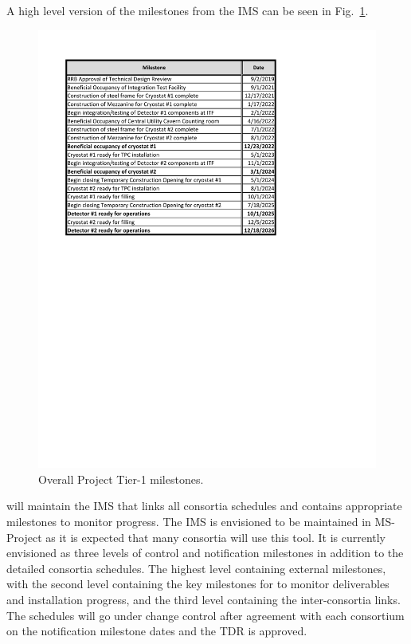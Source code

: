 A high level version of the  milestones from the IMS
can be seen in Fig.~\ref{fig:DUNE_schedule}.
\begin{figure}[htb]
  \begin{center}
    \includegraphics[width=\textwidth]{far-detector-generic/figures/FD_Cnst_Schedule}
    \caption{Overall  Project Tier-1 milestones.}
    \label{fig:DUNE_schedule}
  \end{center}
\end{figure}
 will maintain the IMS that links all consortia schedules
and contains appropriate milestones to monitor progress. The IMS
is envisioned to be maintained in MS-Project as it is expected
that many consortia will use this tool. It is currently envisioned as
three levels of control and notification milestones in addition to the
detailed consortia schedules. The highest level containing external
milestones, with the second level containing the key milestones for 
to monitor deliverables and installation progress, and the third level
containing the inter-consortia links. The schedules will go
under change control after agreement with each consortium on the
notification milestone dates and the TDR is approved.

